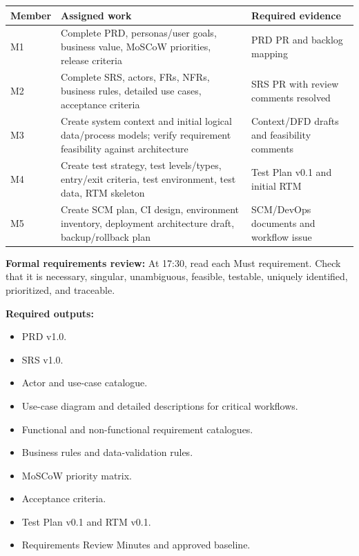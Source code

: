 \documentclass[
  10pt,
  a4paper,
  oneside]{report}
\newcounter{none} %
\providecommand{\tightlist}{%
  \setlength{\itemsep}{0pt}\setlength{\parskip}{0pt}}
\begin{document}
{\def\LTcaptype{none} %
\begin{longtable}[]{@{}
  >{\raggedright\arraybackslash}p{}
  >{\raggedright\arraybackslash}p{}
  >{\raggedright\arraybackslash}p{}@{}}
\toprule\noalign{}
\begin{minipage}[b]{\linewidth}\raggedright
Member
\end{minipage} & \begin{minipage}[b]{\linewidth}\raggedright
Assigned work
\end{minipage} & \begin{minipage}[b]{\linewidth}\raggedright
Required evidence
\end{minipage} \\
\midrule\noalign{}
\endhead
\bottomrule\noalign{}
\endlastfoot
M1 & Complete PRD, personas/user goals, business value, MoSCoW
priorities, release criteria & PRD PR and backlog mapping \\
M2 & Complete SRS, actors, FRs, NFRs, business rules, detailed use
cases, acceptance criteria & SRS PR with review comments resolved \\
M3 & Create system context and initial logical data/process models;
verify requirement feasibility against architecture & Context/DFD drafts
and feasibility comments \\
M4 & Create test strategy, test levels/types, entry/exit criteria, test
environment, test data, RTM skeleton & Test Plan v0.1 and initial RTM \\
M5 & Create SCM plan, CI design, environment inventory, deployment
architecture draft, backup/rollback plan & SCM/DevOps documents and
workflow issue \\
\end{longtable}
}

\textbf{Formal requirements review:} At 17:30, read each Must
requirement. Check that it is necessary, singular, unambiguous,
feasible, testable, uniquely identified, prioritized, and traceable.

\textbf{Required outputs:}

\begin{itemize}
\tightlist
\item
  PRD v1.0.
\item
  SRS v1.0.
\item
  Actor and use-case catalogue.
\item
  Use-case diagram and detailed descriptions for critical workflows.
\item
  Functional and non-functional requirement catalogues.
\item
  Business rules and data-validation rules.
\item
  MoSCoW priority matrix.
\item
  Acceptance criteria.
\item
  Test Plan v0.1 and RTM v0.1.
\item
  Requirements Review Minutes and approved baseline.
\end{itemize}
\end{document}
